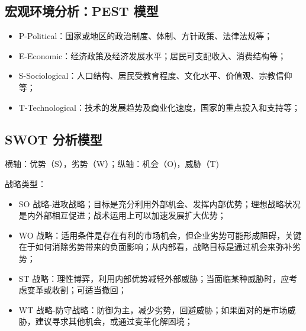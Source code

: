\documentclass[12pt]{article}
\begin{document}
\subsection{宏观环境分析：PEST 模型}
\begin{itemize}
\setlength{\itemsep}{0pt}
\setlength{\parsep}{0pt}
\setlength{\parskip}{0pt}
    \item P-Political：国家或地区的政治制度、体制、方针政策、法律法规等；
    \item E-Economic：经济政策及经济发展水平；居民可支配收入、消费结构等；
    \item S-Sociological：人口结构、居民受教育程度、文化水平、价值观、宗教信仰等；
    \item T-Technological：技术的发展趋势及商业化速度，国家的重点投入和支持等；
\end{itemize}

\subsection{SWOT 分析模型}
横轴：优势（S），劣势（W）；纵轴：机会（O)，威胁（T)

战略类型：
\begin{itemize}
\setlength{\itemsep}{0pt}
\setlength{\parsep}{0pt}
\setlength{\parskip}{0pt}
    \item SO 战略-进攻战略；目标是充分利用外部机会、发挥内部优势；理想战略状况是内外部相互促进；战术运用上可以加速发展扩大优势；
    \item WO 战略：适用条件是存在有利的市场机会，但企业劣势可能形成阻碍，关键在于如何消除劣势带来的负面影响；从内部看，战略目标是通过机会来弥补劣势；
    \item ST 战略：理性博弈，利用内部优势减轻外部威胁；当面临某种威胁时，应考虑变革或收割；可适当撤回；
    \item WT 战略-防守战略：防御为主，减少劣势，回避威胁；如果面对的是市场威胁，建议寻求其他机会，或通过变革化解困境；
\end{itemize}




\end{document}
